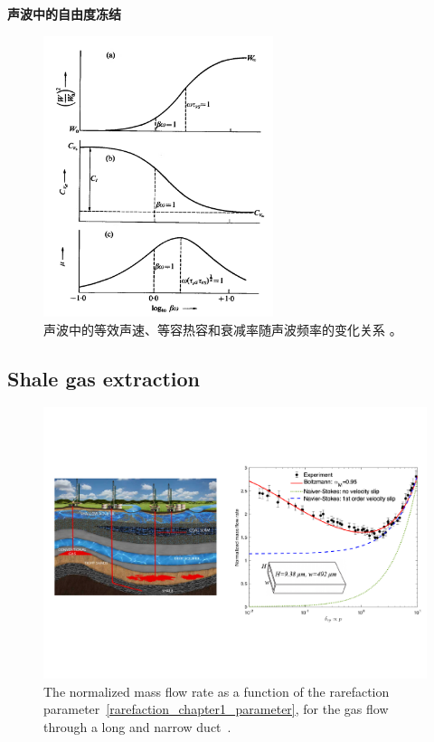 \textbf{声波中的自由度冻结}

\begin{figure}[t]
	\centering
	\includegraphics[width=0.6\textwidth]{Introduction/IMG/frozen_sound_demo.png}
	\caption{ 
	声波中的等效声速、等容热容和衰减率随声波频率的变化关系 \cite{Lambert1977}。
	} %
	\label{fig:sound_frozen}
\end{figure}



\subsection{Shale gas extraction}

\begin{figure}[t]
	\centering
	\includegraphics[width=0.6\columnwidth]{Introduction/IMG/CSG.pdf}
	\caption{ The normalized mass flow rate as a function of the rarefaction parameter~\eqref{rarefaction_chapter1_parameter}, for the gas flow through a long and narrow duct~\cite{Ewart2007,WuStruchtrupJFM2017}. 
}
	\label{ShaleGasExtracton}
\end{figure}


